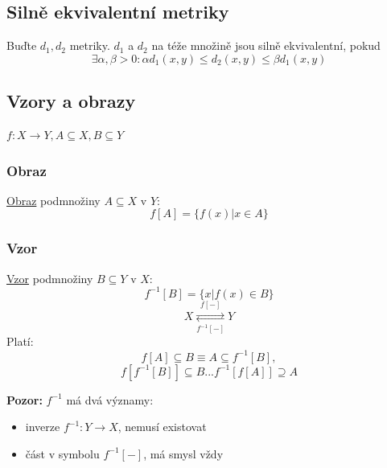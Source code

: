 \documentclass[../main.tex]{subfiles}
\begin{document}
\subsection{Silně ekvivalentní metriky}
\hspace{1.2mm}
Buďte $d_1, d_2$ metriky. $d_1$ a $d_2$ na téže množině jsou silně ekvivalentní, pokud
\[\exists \alpha , \beta > 0: \alpha d_1(x,y) \leq d_2(x,y) \leq \beta d_1(x,y)\]

\subsection{Vzory a obrazy}
\hspace{1.2mm}
$f: X \rightarrow Y, A \subseteq X, B \subseteq Y$
\subsubsection{Obraz}
\hspace{1.2mm}
\underline{Obraz} podmnožiny $A\subseteq X$ v $Y$:
\[f[A] = \{f(x) | x \in A\}\]

\subsubsection{Vzor}
\hspace{1.2mm}
\underline{Vzor} podmnožiny $B\subseteq Y$ v $X$:
\[f^{-1}[B] = \{x | f(x) \in B\}\]
\[X \underset{f^{-1}[-]}{\stackrel{f[-]}{\rightleftarrows}} Y\]
\hspace{1.2mm}
Platí:
\[f[A] \subseteq B \equiv A \subseteq f^{-1}[B],\]
\[f[f^{-1}[B]] \subseteq B  ...  f^{-1}[f[A]] \supseteq A\]

\noindent
\hspace{1.2mm}
\textbf{Pozor:} $f^{-1}$ má dvá významy:
\begin{itemize}
    \item inverze $f^{-1}:Y \rightarrow X$, nemusí existovat
    \item část v symbolu $f^{-1}[-]$, má smysl vždy
 
\end{itemize}
\noindent

\end{document}
